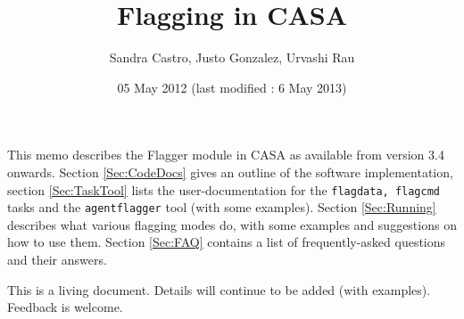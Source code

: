 \documentclass[11pt]{article}
\begin{document}
\title{Flagging in CASA}
\author{Sandra Castro, Justo Gonzalez, Urvashi Rau}
\date{05 May 2012 (last modified : 6 May 2013)}
\maketitle

This memo describes the Flagger module in CASA as available from version 3.4 onwards. Section \ref{Sec:CodeDocs} gives an outline of the software implementation, section \ref{Sec:TaskTool} lists the user-documentation for the {\tt flagdata, flagcmd} tasks and the {\tt agentflagger} tool (with some examples).  Section \ref{Sec:Running} describes what various flagging modes do, with some examples and suggestions on how to use them. Section \ref{Sec:FAQ} contains a list of frequently-asked questions and their answers.

This is a living document. Details will continue to be added (with examples). Feedback is welcome.

\tableofcontents




\end{document}
